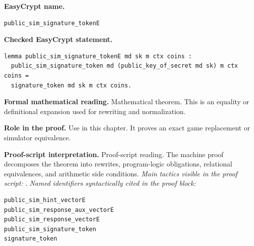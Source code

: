 \begin{formaltheorem}
\noindent\textbf{EasyCrypt name.}
\begin{lstlisting}[language=EasyCrypt,basicstyle=\ttfamily\scriptsize]
public_sim_signature_tokenE
\end{lstlisting}
\noindent\textbf{Checked EasyCrypt statement.}
\begin{lstlisting}[language=EasyCrypt,basicstyle=\ttfamily\scriptsize]
lemma public_sim_signature_tokenE md sk m ctx coins :
  public_sim_signature_token md (public_key_of_secret md sk) m ctx coins =
  signature_token md sk m ctx coins.
\end{lstlisting}
\noindent\textbf{Formal mathematical reading.}
Mathematical theorem. This is an equality or definitional expansion used for rewriting and normalization.

\noindent\textbf{Role in the proof.}
Use in this chapter. It proves an exact game replacement or simulator equivalence.

\noindent\textbf{Proof-script interpretation.}
Proof-script reading. The machine proof decomposes the theorem into rewrites, program-logic obligations, relational equivalences, and arithmetic side conditions.
\emph{Main tactics visible in the proof script:} .
\emph{Named identifiers syntactically cited in the proof block:}
\begin{lstlisting}[language=EasyCrypt,basicstyle=\ttfamily\scriptsize]
public_sim_hint_vectorE
public_sim_response_aux_vectorE
public_sim_response_vectorE
public_sim_signature_token
signature_token
\end{lstlisting}

\end{formaltheorem}

